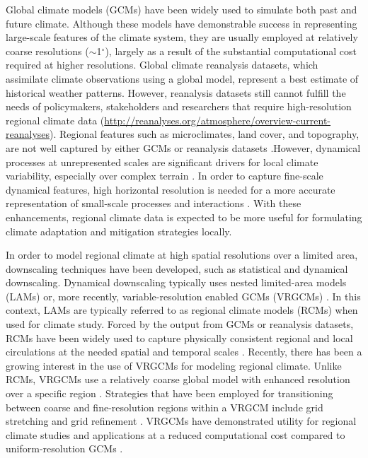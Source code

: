 Global climate models (GCMs) have been widely used to simulate both past and future climate. Although these models have demonstrable success in representing large-scale features of the climate system, they are usually employed at relatively coarse resolutions ($\sim$1$^\circ$), largely as a result of the substantial computational cost required at higher resolutions. Global climate reanalysis datasets, which assimilate climate observations using a global model, represent a best estimate of historical weather patterns. However, reanalysis datasets still cannot fulfill the needs of policymakers, stakeholders and researchers that require high-resolution regional climate data (\url{http://reanalyses.org/atmosphere/overview-current-reanalyses}). Regional features such as microclimates, land cover, and topography, are not well captured by either GCMs or reanalysis datasets \cite{leung2003regional}.However, dynamical processes at unrepresented scales are significant drivers for local climate variability, especially over complex terrain \cite{soares2012wrf}. In order to capture fine-scale dynamical features, high horizontal resolution is needed for a more accurate representation of small-scale processes and interactions \cite{rauscher2010resolution}. With these enhancements, regional climate data is expected to be more useful for formulating climate adaptation and mitigation strategies locally.

In order to model regional climate at high spatial resolutions over a limited area, downscaling techniques have been developed, such as statistical and dynamical downscaling. Dynamical downscaling typically uses nested limited-area models (LAMs) or, more recently, variable-resolution enabled GCMs (VRGCMs) \cite{laprise2008regional}. In this context, LAMs are typically referred to as regional climate models (RCMs) when used for climate study. Forced by the output from GCMs or reanalysis datasets, RCMs have been widely used to capture physically consistent regional and local circulations at the needed spatial and temporal scales \cite{christensen2007regional, bukovsky2009precipitation, mearns2012north}. Recently, there has been a growing interest in the use of VRGCMs for modeling regional climate. Unlike RCMs, VRGCMs use a relatively coarse global model with enhanced resolution over a specific region \cite{staniforth1978variable, fox1997finite}.  Strategies that have been employed for transitioning between coarse and fine-resolution regions within a VRGCM include grid stretching \cite{fox1997finite, mcgregor2008updated} and grid refinement \cite{ringler2008multiresolution, skamarock2012multiscale, zarzycki2014aquaplanet}. VRGCMs have demonstrated utility for regional climate studies and applications at a reduced computational cost compared to uniform-resolution GCMs \cite{fox2006variable, rauscher2013exploring, zarzycki2015effects}. 

